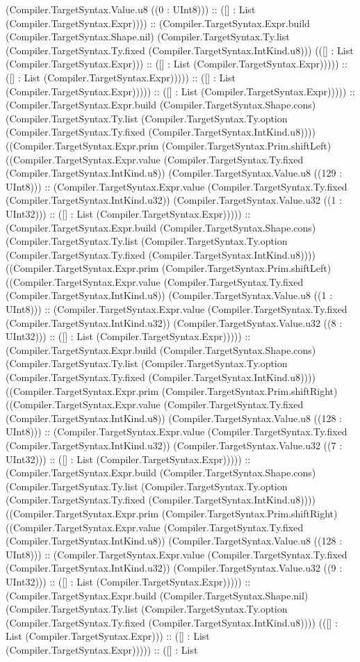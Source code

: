 \documentclass[11pt]{article}
\begin{document}
(Compiler.TargetSyntax.Value.u8 ((0 : UInt8))) :: ([] : List (Compiler.TargetSyntax.Expr)))) :: (Compiler.TargetSyntax.Expr.build (Compiler.TargetSyntax.Shape.nil) (Compiler.TargetSyntax.Ty.list (Compiler.TargetSyntax.Ty.fixed (Compiler.TargetSyntax.IntKind.u8))) (([] : List (Compiler.TargetSyntax.Expr))) :: ([] : List (Compiler.TargetSyntax.Expr))))) :: ([] : List (Compiler.TargetSyntax.Expr))))) :: ([] : List (Compiler.TargetSyntax.Expr))))) :: ([] : List (Compiler.TargetSyntax.Expr))))) :: (Compiler.TargetSyntax.Expr.build (Compiler.TargetSyntax.Shape.cons) (Compiler.TargetSyntax.Ty.list (Compiler.TargetSyntax.Ty.option (Compiler.TargetSyntax.Ty.fixed (Compiler.TargetSyntax.IntKind.u8)))) ((Compiler.TargetSyntax.Expr.prim (Compiler.TargetSyntax.Prim.shiftLeft) ((Compiler.TargetSyntax.Expr.value (Compiler.TargetSyntax.Ty.fixed (Compiler.TargetSyntax.IntKind.u8)) (Compiler.TargetSyntax.Value.u8 ((129 : UInt8))) :: (Compiler.TargetSyntax.Expr.value (Compiler.TargetSyntax.Ty.fixed (Compiler.TargetSyntax.IntKind.u32)) (Compiler.TargetSyntax.Value.u32 ((1 : UInt32))) :: ([] : List (Compiler.TargetSyntax.Expr))))) :: (Compiler.TargetSyntax.Expr.build (Compiler.TargetSyntax.Shape.cons) (Compiler.TargetSyntax.Ty.list (Compiler.TargetSyntax.Ty.option (Compiler.TargetSyntax.Ty.fixed (Compiler.TargetSyntax.IntKind.u8)))) ((Compiler.TargetSyntax.Expr.prim (Compiler.TargetSyntax.Prim.shiftLeft) ((Compiler.TargetSyntax.Expr.value (Compiler.TargetSyntax.Ty.fixed (Compiler.TargetSyntax.IntKind.u8)) (Compiler.TargetSyntax.Value.u8 ((1 : UInt8))) :: (Compiler.TargetSyntax.Expr.value (Compiler.TargetSyntax.Ty.fixed (Compiler.TargetSyntax.IntKind.u32)) (Compiler.TargetSyntax.Value.u32 ((8 : UInt32))) :: ([] : List (Compiler.TargetSyntax.Expr))))) :: (Compiler.TargetSyntax.Expr.build (Compiler.TargetSyntax.Shape.cons) (Compiler.TargetSyntax.Ty.list (Compiler.TargetSyntax.Ty.option (Compiler.TargetSyntax.Ty.fixed (Compiler.TargetSyntax.IntKind.u8)))) ((Compiler.TargetSyntax.Expr.prim (Compiler.TargetSyntax.Prim.shiftRight) ((Compiler.TargetSyntax.Expr.value (Compiler.TargetSyntax.Ty.fixed (Compiler.TargetSyntax.IntKind.u8)) (Compiler.TargetSyntax.Value.u8 ((128 : UInt8))) :: (Compiler.TargetSyntax.Expr.value (Compiler.TargetSyntax.Ty.fixed (Compiler.TargetSyntax.IntKind.u32)) (Compiler.TargetSyntax.Value.u32 ((7 : UInt32))) :: ([] : List (Compiler.TargetSyntax.Expr))))) :: (Compiler.TargetSyntax.Expr.build (Compiler.TargetSyntax.Shape.cons) (Compiler.TargetSyntax.Ty.list (Compiler.TargetSyntax.Ty.option (Compiler.TargetSyntax.Ty.fixed (Compiler.TargetSyntax.IntKind.u8)))) ((Compiler.TargetSyntax.Expr.prim (Compiler.TargetSyntax.Prim.shiftRight) ((Compiler.TargetSyntax.Expr.value (Compiler.TargetSyntax.Ty.fixed (Compiler.TargetSyntax.IntKind.u8)) (Compiler.TargetSyntax.Value.u8 ((128 : UInt8))) :: (Compiler.TargetSyntax.Expr.value (Compiler.TargetSyntax.Ty.fixed (Compiler.TargetSyntax.IntKind.u32)) (Compiler.TargetSyntax.Value.u32 ((9 : UInt32))) :: ([] : List (Compiler.TargetSyntax.Expr))))) :: (Compiler.TargetSyntax.Expr.build (Compiler.TargetSyntax.Shape.nil) (Compiler.TargetSyntax.Ty.list (Compiler.TargetSyntax.Ty.option (Compiler.TargetSyntax.Ty.fixed (Compiler.TargetSyntax.IntKind.u8)))) (([] : List (Compiler.TargetSyntax.Expr))) :: ([] : List (Compiler.TargetSyntax.Expr))))) :: ([] : List 
\end{document}
